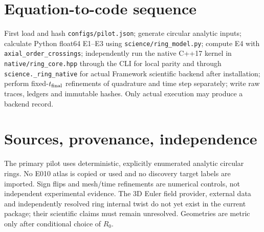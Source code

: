 \documentclass[10pt,a4paper]{article}
\begin{document}
\section{Equation-to-code sequence}
First load and hash \texttt{configs/pilot.json}; generate circular analytic inputs; calculate Python float64 E1--E3 using \texttt{science/ring\_model.py}; compute E4 with \texttt{axial\_order\_crossings}; independently run the native C++17 kernel in \texttt{native/ring\_core.hpp} through the CLI for local parity and through \texttt{science.\_ring\_native} for actual Framework scientific backend after installation; perform fixed-$t_{\rm final}$ refinements of quadrature and time step separately; write raw traces, ledgers and immutable hashes. Only actual execution may produce a backend record.

\section{Sources, provenance, independence}
The primary pilot uses deterministic, explicitly enumerated analytic circular rings. No E010 atlas is copied or used and no discovery target labels are imported. Sign flips and mesh/time refinements are numerical controls, not independent experimental evidence. The 3D Euler field provider, external data and independently resolved ring internal twist do not yet exist in the current package; their scientific claims must remain unresolved. Geometries are metric only after conditional choice of $R_0$.

\end{document}
